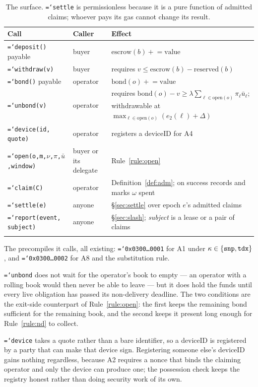 \documentclass[11pt,a4paper]{article}
\newcommand{\code}[1]{\texttt{\hyphenchar\font=`\-\relax #1}}
\newcommand{\bond}{\mathrm{bond}}
\newcommand{\esc}{\mathrm{escrow}}
\newcommand{\res}{\mathrm{reserved}}
\newcommand{\open}{\mathrm{open}}
\begin{document}
\begin{longtable}{@{}p{}p{}p{}@{}}
\toprule
Call & Caller & Effect \\
\midrule
\endhead
\code{deposit()} payable & buyer & $\esc(b) \mathrel{+}= \text{value}$ \\
\code{withdraw(v)} & buyer & requires $v \le \esc(b)-\res(b)$ \\
\code{bond()} payable & operator & $\bond(o) \mathrel{+}= \text{value}$ \\
\code{unbond(v)} & operator & requires
$\bond(o) - v \ge \lambda \sum_{\ell \in \open(o)} \pi_\ell \bar u_\ell$;
withdrawable at $\max_{\ell \in \open(o)} (e_2(\ell) + \Delta)$ \\
\code{device(id, quote)} & operator & registers a deviceID for A4 \\
\code{open(o,m,$\nu$,$\pi$,$\bar u$,window)} & buyer or its delegate & Rule~\ref{rule:open} \\
\code{claim(C)} & operator & Definition~\ref{def:adm}; on success records and
marks $\omega$ spent \\
\code{settle(e)} & anyone & §\ref{sec:settle} over epoch $e$'s admitted claims \\
\code{report(event, subject)} & anyone & §\ref{sec:slash}; \emph{subject} is a
lease or a pair of claims \\
\bottomrule
\caption{The surface. \code{settle} is permissionless because it is a pure
function of admitted claims; whoever pays its gas cannot change its result.}
\end{longtable}

The precompiles it calls, all existing: \code{0x0300\ldots0001} for A1 under
$\kappa \in \{\code{snp},\code{tdx}\}$, and \code{0x0300\ldots0002} for A8 and
the substitution rule.

\code{unbond} does not wait for the operator's book to empty --- an operator
with a rolling book would then never be able to leave --- but it does hold the
funds until every live obligation has passed its non-delivery deadline. The two
conditions are the exit-side counterpart of Rule~\ref{rule:open}: the first keeps
the remaining bond sufficient for the remaining book, and the second keeps it
present long enough for Rule~\ref{rule:nd} to collect.

\code{device} takes a quote rather than a bare identifier, so a deviceID is
registered by a party that can make that device sign. Registering someone else's
deviceID gains nothing regardless, because A2 requires a nonce that binds the
claiming operator and only the device can produce one; the possession check keeps
the registry honest rather than doing security work of its own.
\end{document}
